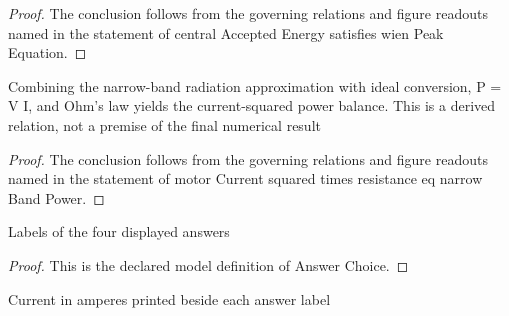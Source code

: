 \begin{proof}
  The conclusion follows from the governing relations and figure readouts named in the statement of central Accepted Energy satisfies wien Peak Equation.
\end{proof}
\begin{lemma}
  \label{lem:physics:phyx-mini-0614:phyxminiproblems-problemphyxmini0614-motorcurrent-squared-times-resistance-eq-narrowbandpower}
  Combining the narrow-band radiation approximation with ideal conversion, P = V I, and Ohm's law yields the current-squared power balance. This is a derived relation, not a premise of the final numerical result
\end{lemma}
\begin{proof}
  The conclusion follows from the governing relations and figure readouts named in the statement of motor Current squared times resistance eq narrow Band Power.
\end{proof}
\begin{definition}
  \label{def:physics:phyx-mini-0614:phyxminiproblems-problemphyxmini0614-answerchoice}
  Labels of the four displayed answers
\end{definition}
\begin{proof}
  This is the declared model definition of Answer Choice.
\end{proof}
\begin{definition}
  \label{def:physics:phyx-mini-0614:phyxminiproblems-problemphyxmini0614-displayedanswercurrentinamperes}
  Current in amperes printed beside each answer label
\end{definition}
